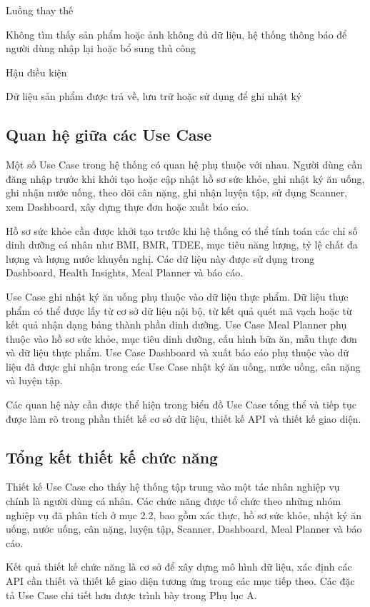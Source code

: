 \documentclass[12pt, a4paper]{report}
\begin{document}
Luồng thay thế

Không tìm thấy sản phẩm hoặc ảnh không đủ dữ liệu, hệ thống thông báo để người dùng nhập lại hoặc bổ sung thủ công

Hậu điều kiện

Dữ liệu sản phẩm được trả về, lưu trữ hoặc sử dụng để ghi nhật ký

\subsection{Quan hệ giữa các Use Case}Một số Use Case trong hệ thống có quan hệ phụ thuộc với nhau. Người dùng cần đăng nhập trước khi khởi tạo hoặc cập nhật hồ sơ sức khỏe, ghi nhật ký ăn uống, ghi nhận nước uống, theo dõi cân nặng, ghi nhận luyện tập, sử dụng Scanner, xem Dashboard, xây dựng thực đơn hoặc xuất báo cáo.

Hồ sơ sức khỏe cần được khởi tạo trước khi hệ thống có thể tính toán các chỉ số dinh dưỡng cá nhân như BMI, BMR, TDEE, mục tiêu năng lượng, tỷ lệ chất đa lượng và lượng nước khuyến nghị. Các dữ liệu này được sử dụng trong Dashboard, Health Insights, Meal Planner và báo cáo.

Use Case ghi nhật ký ăn uống phụ thuộc vào dữ liệu thực phẩm. Dữ liệu thực phẩm có thể được lấy từ cơ sở dữ liệu nội bộ, từ kết quả quét mã vạch hoặc từ kết quả nhận dạng bảng thành phần dinh dưỡng. Use Case Meal Planner phụ thuộc vào hồ sơ sức khỏe, mục tiêu dinh dưỡng, cấu hình bữa ăn, mẫu thực đơn và dữ liệu thực phẩm. Use Case Dashboard và xuất báo cáo phụ thuộc vào dữ liệu đã được ghi nhận trong các Use Case nhật ký ăn uống, nước uống, cân nặng và luyện tập.

Các quan hệ này cần được thể hiện trong biểu đồ Use Case tổng thể và tiếp tục được làm rõ trong phần thiết kế cơ sở dữ liệu, thiết kế API và thiết kế giao diện.

\subsection{Tổng kết thiết kế chức năng}Thiết kế Use Case cho thấy hệ thống tập trung vào một tác nhân nghiệp vụ chính là người dùng cá nhân. Các chức năng được tổ chức theo những nhóm nghiệp vụ đã phân tích ở mục 2.2, bao gồm xác thực, hồ sơ sức khỏe, nhật ký ăn uống, nước uống, cân nặng, luyện tập, Scanner, Dashboard, Meal Planner và báo cáo.

Kết quả thiết kế chức năng là cơ sở để xây dựng mô hình dữ liệu, xác định các API cần thiết và thiết kế giao diện tương ứng trong các mục tiếp theo. Các đặc tả Use Case chi tiết hơn được trình bày trong Phụ lục A.
\end{document}
